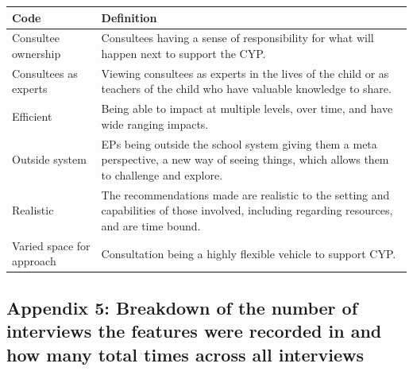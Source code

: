 \documentclass[
  english,
  man,floatsintext]{apa6}
\begin{document}
\begin{longtable}[]{@{}
  >{\raggedright\arraybackslash}p{}
  >{\raggedright\arraybackslash}p{}@{}}
\toprule
Code & Definition \\
\midrule
\endhead
Consultee ownership & Consultees having a sense of responsibility
for what will happen next to support the
CYP. \\
Consultees as experts & Viewing consultees as experts in the lives
of the child or as teachers of the child
who have valuable knowledge to share. \\
Efficient & Being able to impact at multiple levels,
over time, and have wide ranging impacts. \\
Outside system & EPs being outside the school system giving
them a meta perspective, a new way of
seeing things, which allows them to
challenge and explore. \\
Realistic & The recommendations made are realistic to
the setting and capabilities of those
involved, including regarding resources,
and are time bound. \\
Varied space for
approach & Consultation being a highly flexible
vehicle to support CYP. \\
\bottomrule
\end{longtable}

\newpage

\hypertarget{appendix-5-breakdown-of-the-number-of-interviews-the-features-were-recorded-in-and-how-many-total-times-across-all-interviews}{%
\subsection{Appendix 5: Breakdown of the number of interviews the features were recorded in and how many total times across all interviews}\label{appendix-5-breakdown-of-the-number-of-interviews-the-features-were-recorded-in-and-how-many-total-times-across-all-interviews}}
\end{document}
